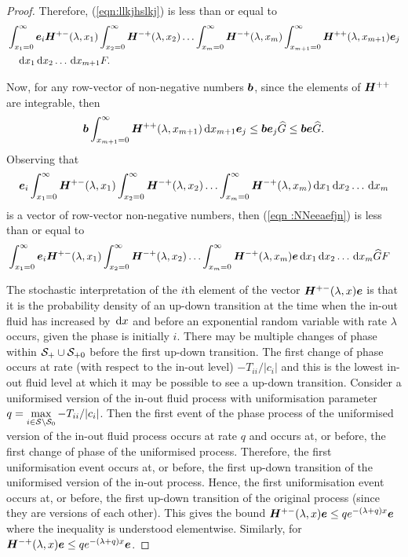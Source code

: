 \begin{proof}
    Therefore, (\ref{eqn:llkjhslkj}) is less than or equal to 
	\begin{align}
		&\int_{x_1=0}^\infty \boldsymbol e_i\boldsymbol H^{+-}(\lambda,x_1)\nonumber
		\int_{x_2=0}^\infty \boldsymbol H^{-+}(\lambda,x_2) 
		\hdots \int_{x_m=0}^\infty \boldsymbol H^{-+}(\lambda, x_m) 
		\int_{x_{m+1}=0}^\infty \boldsymbol H^{++}(\lambda,x_{m+1})\boldsymbol e_j
		\\&\quad\, \mathrm{d} x_1  \, \mathrm{d} x_2 \dots \, \mathrm{d} x_{m+1}  F. \label{eqn :NNeeaefjn}
	\end{align}

	Now, for any row-vector of non-negative numbers \(\boldsymbol b\), since the elements of \(\boldsymbol H^{++}\) are integrable, then 
	\[\boldsymbol b \int_{x_{m+1}=0}^\infty \boldsymbol H^{++}(\lambda, x_{m+1})\, \mathrm{d} x_{m+1} \boldsymbol e_j \leq \boldsymbol b \boldsymbol e_j \widehat G\leq \boldsymbol b \boldsymbol e \widehat G.\]
	Observing that  
	\[\boldsymbol e_i \int_{x_1=0}^\infty \boldsymbol H^{+-}(\lambda,x_1)
	\int_{x_2=0}^\infty \boldsymbol H^{-+}(\lambda,x_2) 
	\hdots \int_{x_m=0}^\infty \boldsymbol H^{-+}(\lambda, x_m) 
	\, \mathrm{d} x_1  \, \mathrm{d} x_2 \dots \, \mathrm{d} x_{m}\] 
	is a vector of row-vector non-negative numbers, then (\ref{eqn :NNeeaefjn}) is less than or equal to 
	\begin{align}
		&\int_{x_1=0}^\infty \boldsymbol e_i\boldsymbol H^{+-}(\lambda,x_1)
		\int_{x_2=0}^\infty \boldsymbol H^{-+}(\lambda,x_2) 
		\hdots \int_{x_m=0}^\infty \boldsymbol H^{-+}(\lambda, x_m) \boldsymbol e
		\, \mathrm{d} x_1  \, \mathrm{d} x_2 \dots \, \mathrm{d} x_{m} \widehat{G} F \label{eqn :NNeeaefjn12}
	\end{align}

	The stochastic interpretation of the \(i\)th element of the vector \(\boldsymbol H^{+-}(\lambda,x)\boldsymbol e\) is that it is the probability density of an up-down transition at the time when the in-out fluid has increased by \(\, \mathrm{d} x\) and before an exponential random variable with rate \(\lambda\) occurs, given the phase is initially \(i\). There may be multiple changes of phase within \(\mathcal S_+\cup\mathcal{S}_{+0}\) before the first up-down transition. The first change of phase occurs at rate (with respect to the in-out level) \(-T_{ii}/|c_i|\) and this is the lowest in-out fluid level at which it may be possible to see a up-down transition. Consider a uniformised version of the in-out fluid process with uniformisation parameter \(q = \max\limits_{i\in\mathcal S\setminus \mathcal{S}_0}-T_{ii}/|c_i|\). Then the first event of the phase process of the uniformised version of the in-out fluid process occurs at rate \(q\) and occurs at, or before, the first change of phase of the uniformised process. Therefore, the first uniformisation event occurs at, or before, the first up-down transition of the uniformised version of the in-out process. Hence, the first uniformisation event occurs at, or before, the first up-down transition of the original process (since they are versions of each other). This gives the bound \(\boldsymbol H^{+-}(\lambda,x)\boldsymbol e\leq qe^{-(\lambda + q)x}\boldsymbol e\) where the inequality is understood elementwise.	Similarly, for \(\boldsymbol H^{-+}(\lambda,x)\boldsymbol e\leq qe^{-(\lambda + q)x}\boldsymbol e\).
	

\end{proof}
